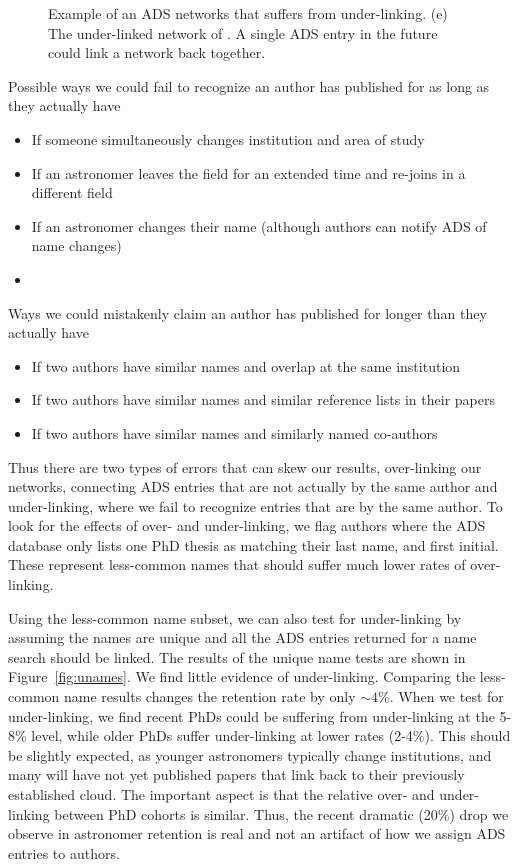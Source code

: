 \documentclass{emulateapj}
\begin{document}
\begin{figure}
  \caption{Example of an ADS networks that suffers from under-linking.  (e) The under-linked network of \citet{Capelo12}.  A single ADS entry in the future could link a network back together.}
\end{figure}


Possible ways we could fail to recognize an author has published for as long as they actually have
\begin{itemize}
\item{If someone simultaneously changes institution and area of study}
  \item{If an astronomer leaves the field for an extended time and re-joins in a different field}
\item{If an astronomer changes their name (although authors can notify ADS of name changes)}
  \item{}
\end{itemize}

Ways we could mistakenly claim an author has published for longer than they actually have
\begin{itemize}
\item{If two authors have similar names and overlap at the same institution}
\item{If two authors have similar names and similar reference lists in their papers}
  \item{If two authors have similar names and similarly named co-authors}
\end{itemize}

Thus there are two types of errors that can skew our results, over-linking our networks, connecting ADS entries that are not actually by the same author and under-linking, where we fail to recognize entries that are by the same author.  To look for the effects of over- and under-linking, we flag authors where the ADS database only lists one PhD thesis as matching their last name, and first initial. These represent less-common names that should suffer much lower rates of over-linking.

Using the less-common name subset, we can also test for under-linking by assuming the names are unique and all the ADS entries returned for a name search should be linked.  The results of the unique name tests are shown in Figure~\ref{fig:unames}. We find little evidence of under-linking. Comparing the less-common name results changes the retention rate by only $\sim4$\%. When we test for under-linking, we find recent PhDs could be suffering from under-linking at the 5-8\% level, while older PhDs suffer under-linking at lower rates (2-4\%).  This should be slightly expected, as younger astronomers typically change institutions, and many will have not yet published papers that link back to their previously established cloud.  The important aspect is that the relative over- and under-linking between PhD cohorts is similar.  Thus, the recent dramatic (20\%) drop we observe in astronomer retention is real and not an artifact of how we assign ADS entries to authors.
\end{document}
